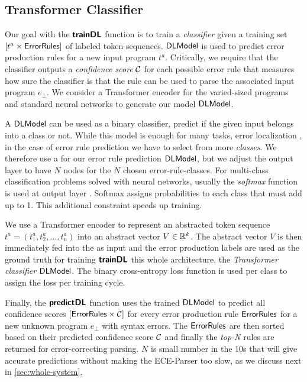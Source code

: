 \subsection{Transformer Classifier}
\label{sec:seq-classifiers:location-rank}

Our goal with the $\bm{\mathsf{trainDL}}$ function is to train a \emph{classifier} given a
training set $[t^a \times \mathsf{ErrorRules}]$ of labeled token sequences.
$\mathsf{DLModel}$ is used to predict error production rules for a new input program
$t^a$. Critically, we require that the classifier outputs a \emph{confidence
score} $\mathcal{C}$ for each possible error rule that measures how sure the
classifier is that the rule can be used to parse the associated input program
$e_{\bot}$. We consider a Transformer encoder for the varied-sized programs and
standard neural networks to generate our model $\mathsf{DLModel}$.

%
A \dnn $\mathsf{DLModel}$ can be used as a binary classifier, \ie predict if the given
input belongs into a class or not. While this model is enough for many tasks,
\eg error localization \citep{Sakkas_2020, Seidel:2017}, in the case of error
rule prediction we have to select from more \emph{classes}. We therefore use a
\dnn for our error rule prediction $\mathsf{DLModel}$, but we adjust the output layer to
have $N$ nodes for the $N$ chosen error-rule-classes. For multi-class
classification problems solved with neural networks, usually the \emph{softmax}
function is used at output layer \citep{Goodfellow-et-al-2016,
Bishop-book-2006}. Softmax assigns probabilities to each class that must add up
to 1. This additional constraint speeds up training.

%
We use a Transformer encoder to represent an abstracted token sequence $t^a =
(t^a_1, t^a_2, \dots, t^a_n)$ into an abstract vector $V \in \mathbb{R}^k$. The abstract
vector $V$ is then immediately fed into the \dnn as input and the error
production labels are used as the ground truth for training $\bm{\mathsf{trainDL}}$ this
whole architecture, \ie the \emph{Transformer classifier} $\mathsf{DLModel}$. The binary
cross-entropy loss function is used per class to assign the loss per training
cycle.

Finally, the $\bm{\mathsf{predictDL}}$ function uses the trained $\mathsf{DLModel}$ to predict all
confidence scores $[\mathsf{ErrorRules} \times \mathcal{C}]$ for every error
production rule $\mathsf{ErrorRules}$ for a new unknown program $e_\bot$ with syntax
errors. The $\mathsf{ErrorRules}$ are then sorted based on their predicted confidence
score $\mathcal{C}$ and finally the \emph{top-N} rules are returned for
error-correcting parsing. $N$ is small number in the 10s that will give accurate
predictions without making the ECE-Parser too slow, as we discuss next in
\autoref{sec:whole-system}.
